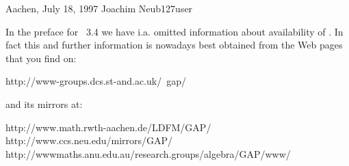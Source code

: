 Aachen, July 18, 1997 \hfill Joachim Neub\accent127user


In   the preface for {\GAP}~3.4  we   have i.a. omitted information about
availability of {\GAP}. In fact this  and further information is nowadays
best obtained from the {\GAP} Web pages that you find on:

\begintt
    http://www-groups.dcs.st-and.ac.uk/~gap/
\endtt

and its mirrors at:

\begintt
    http://www.math.rwth-aachen.de/LDFM/GAP/
    http://www.ccs.neu.edu/mirrors/GAP/
    http://wwwmaths.anu.edu.au/research.groups/algebra/GAP/www/
\endtt

